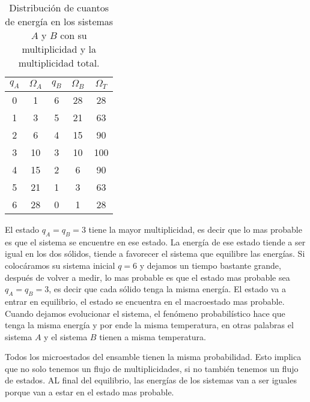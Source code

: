 \documentclass[11pt,fleqn]{book}
\begin{document}
\begin{table}[H]
    \centering
    \begin{tabular}{c c c c c}
    \hline\hline
    $q_{A}$ &   $\Omega_{A}$    &   $q_{B}$ &   $\Omega_{B}$  &  $\Omega_{T}$\\
    \hline
     0  &   1   &   6   &   28  &   28  \\
     1  &   3   &   5   &   21  &   63  \\
     2  &   6   &   4   &   15  &   90  \\
     3  &   10  &   3   &   10  &   100 \\  
     4  &   15  &   2   &   6   &   90  \\
     5  &   21  &   1   &   3   &   63  \\  
     6  &   28  &   0   &   1   &   28  \\
    \end{tabular}
    \caption{Distribución de cuantos de energía en los sistemas $A$ y $B$ con su multiplicidad y la multiplicidad total.}
    \label{tab:my_label}
\end{table}

El estado $q_{A}=q_{B}=3$ tiene la mayor multiplicidad, es decir que lo mas probable es que el sistema se encuentre en ese estado. La energía de ese estado tiende a ser igual en los dos sólidos, tiende a favorecer el sistema que equilibre las energías. Si colocáramos su sistema inicial $q=6$ y dejamos un tiempo bastante grande, después de volver a medir, lo mas probable es que el estado mas probable sea $q_{A}=q_{B}=3$, es decir que cada sólido tenga la misma energía. El estado va a entrar en equilibrio, el estado se encuentra en el macroestado  mas probable. Cuando dejamos evolucionar el sistema, el fenómeno probabilístico hace que tenga la misma energía y por ende la misma temperatura, en otras palabras el sistema $A$ y el sistema $B$ tienen a misma temperatura.

Todos los microestados del ensamble tienen la misma probabilidad. Esto implica que no solo tenemos un flujo de multiplicidades, si no también tenemos un flujo de estados. AL final del equilibrio, las energías de los sistemas van a ser iguales porque van a estar en el estado mas probable.
\end{document}
